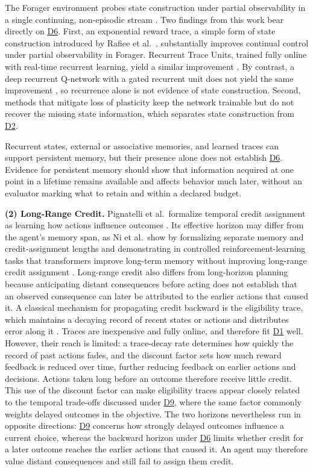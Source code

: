 \documentclass[10pt,journal,compsoc]{IEEEtran}
\DeclareRobustCommand{\Dref}[1]{\hyperref[sec:d#1]{D#1}}
\begin{document}
The Forager environment probes state construction under partial observability in a single continuing, non-episodic stream \cite{tang2026}.
Two findings from this work bear directly on \Dref{6}.
First, an exponential reward trace, a simple form of state construction introduced by Rafiee et al.\ \cite{rafiee2023}, substantially improves continual control under partial observability in Forager.
Recurrent Trace Units, trained fully online with real-time recurrent learning, yield a similar improvement \cite{elelimy2024}.
By contrast, a deep recurrent Q-network with a gated recurrent unit does not yield the same improvement \cite{tang2026}, so recurrence alone is not evidence of state construction.
Second, methods that mitigate loss of plasticity keep the network trainable but do not recover the missing state information, which separates state construction from \Dref{2}.

Recurrent states, external or associative memories, and learned traces can support persistent memory, but their presence alone does not establish \Dref{6}.
Evidence for persistent memory should show that information acquired at one point in a lifetime remains available and affects behavior much later, without an evaluator marking what to retain and within a declared budget.

\noindent\textbf{(2) Long-Range Credit.}
Pignatelli et al.\ formalize temporal credit assignment as learning how actions influence outcomes \cite{pignatelli2024}.
Its effective horizon may differ from the agent's memory span, as Ni et al.\ show by formalizing separate memory and credit-assignment lengths and demonstrating in controlled reinforcement-learning tasks that transformers improve long-term memory without improving long-range credit assignment \cite{ni2023}.
Long-range credit also differs from long-horizon planning because anticipating distant consequences before acting does not establish that an observed consequence can later be attributed to the earlier actions that caused it.
A classical mechanism for propagating credit backward is the eligibility trace, which maintains a decaying record of recent states or actions and distributes error along it \cite{sutton2018}.
Traces are inexpensive and fully online, and therefore fit \Dref{1} well.
However, their reach is limited: a trace-decay rate determines how quickly the record of past actions fades, and the discount factor sets how much reward feedback is reduced over time, further reducing feedback on earlier actions and decisions.
Actions taken long before an outcome therefore receive little credit.
This use of the discount factor can make eligibility traces appear closely related to the temporal trade-offs discussed under \Dref{9}, where the same factor commonly weights delayed outcomes in the objective.
The two horizons nevertheless run in opposite directions: \Dref{9} concerns how strongly delayed outcomes influence a current choice, whereas the backward horizon under \Dref{6} limits whether credit for a later outcome reaches the earlier actions that caused it.
An agent may therefore value distant consequences and still fail to assign them credit.
\end{document}

